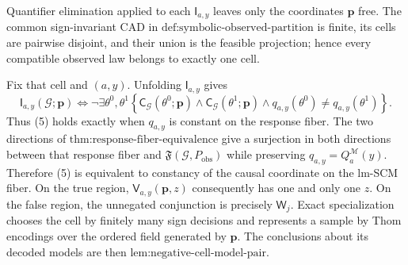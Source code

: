 Quantifier elimination applied to each \(\mathsf I_{a,y}\) leaves only the coordinates \(\mathbf p\) free. The common sign-invariant CAD in \(\text{def:symbolic-observed-partition}\) is finite, its cells are pairwise disjoint, and their union is the feasible projection; hence every compatible observed law belongs to exactly one cell.

Fix that cell and \((a,y)\). Unfolding \(\mathsf I_{a,y}\) gives
\[
\mathsf I_{a,y}(\mathcal G;\mathbf p)
\Longleftrightarrow
\neg\exists\theta^0,\theta^1
\left\{
\mathsf C_{\mathcal G}(\theta^0;\mathbf p)\wedge
\mathsf C_{\mathcal G}(\theta^1;\mathbf p)\wedge
q_{a,y}(\theta^0)\neq q_{a,y}(\theta^1)
\right\}.
\tag{5}
\]
Thus (5) holds exactly when \(q_{a,y}\) is constant on the response fiber. The two directions of \(\text{thm:response-fiber-equivalence}\) give a surjection in both directions between that response fiber and \(\mathfrak F(\mathcal G,P_{\mathrm{obs}})\) while preserving \(q_{a,y}=Q_a^{\mathcal M}(y)\). Therefore (5) is equivalent to constancy of the causal coordinate on the lm-SCM fiber. On the true region, \(\mathsf V_{a,y}(\mathbf p,z)\) consequently has one and only one \(z\). On the false region, the unnegated conjunction is precisely \(\mathsf W_j\). Exact specialization chooses the cell by finitely many sign decisions and represents a sample by Thom encodings over the ordered field generated by \(\mathbf p\). The conclusions about its decoded models are then \(\text{lem:negative-cell-model-pair}\).